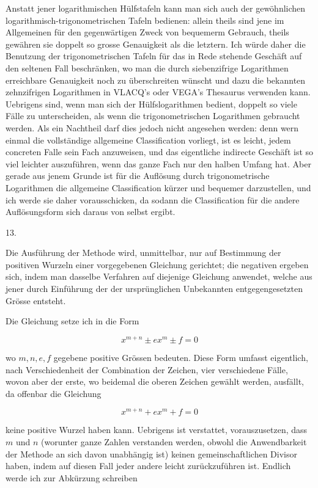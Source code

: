 \documentclass[twoside,12pt, showframe]{memoir}
\begin{document}
Anstatt jener logarithmischen Hülfstafeln kann man sich auch der gewöhnlichen logarithmisch-trigonometrischen Tafeln bedienen: allein theils sind jene im Allgemeinen für den gegenwärtigen Zweck von bequemerm Gebrauch, theils gewähren sie doppelt so grosse Genauigkeit als die letztern. Ich würde daher die Benutzung der trigonometrischen Tafeln für das in Rede stehende Geschäft auf den seltenen Fall beschränken, wo man die durch siebenzifrige Logarithmen erreichbare Genauigkeit noch zu überschreiten wünscht und dazu die bekannten zehnzifrigen Logarithmen in VLACQ's oder VEGA's Thesaurus verwenden kann. Uebrigens sind, wenn man sich der Hülfslogarithmen bedient, doppelt so viele Fälle zu unterscheiden, als wenn die trigonometrischen Logarithmen gebraucht werden. Als ein Nachtheil darf dies jedoch nicht angesehen werden: denn wern einmal die vollständige allgemeine Classification vorliegt, ist es leicht, jedem concreten Falle sein Fach anzuweisen, und das eigentliche indirecte Geschäft ist so viel leichter auszuführen, wenn das ganze Fach nur den halben Umfang hat. Aber gerade aus jenem Grunde ist für die Auflösung durch trigonometrische Logarithmen die allgemeine Classification kürzer und bequemer darzustellen, und ich werde sie daher vorausschicken, da sodann die Classification für die andere Auflösungsform sich daraus von selbst ergibt.

13.

Die Ausführung der Methode wird, unmittelbar, nur auf Bestimmung der positiven Wurzeln einer vorgegebenen Gleichung gerichtet; die negativen ergeben
sich, indem man dasselbe Verfahren auf diejenige Gleichung anwendet, welche aus jener durch Einführung der der ursprünglichen Unbekannten entgegengesetzten Grösse entsteht.

Die Gleichung setze ich in die Form

\[
x^{m+n} \pm e x^{m} \pm f=0
\]

wo \(m, n, e, f\) gegebene positive Grössen bedeuten. Diese Form umfasst eigentlich, nach Verschiedenheit der Combination der Zeichen, vier verschiedene Fälle, wovon aber der erste, wo beidemal die oberen Zeichen gewählt werden, ausfällt, da offenbar die Gleichung

\[
x^{m+n}+e x^{m}+f=0
\]

keine positive Wurzel haben kann. Uebrigens ist verstattet, vorauszusetzen, dass \(m\) und \(n\) (worunter ganze Zahlen verstanden werden, obwohl die Anwendbarkeit der Methode an sich davon unabhängig ist) keinen gemeinschaftlichen Divisor haben, indem auf diesen Fall jeder andere leicht zurückzuführen ist. Endlich werde ich zur Abkürzung schreiben
\end{document}

